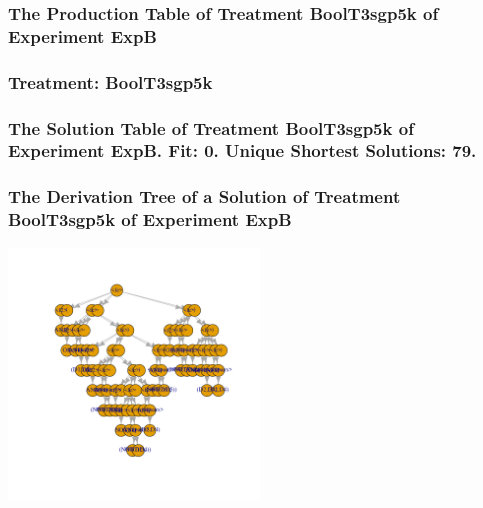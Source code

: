\documentclass[18pt,c]{beamer}
\begin{document}
 \begin{frame}
 \fontsize{8pt}{9pt}\selectfont
 \frametitle{ The Production Table of Treatment BoolT3sgp5k of Experiment ExpB }

 \label{ExpBGrammarTable023.tex}  
 \end{frame}

 \begin{frame}
 \fontsize{8pt}{9pt}\selectfont
 \frametitle{ Treatment: BoolT3sgp5k }

 \label{ExpBStatsTable025.tex}  
 \end{frame}

 \begin{frame}
 \fontsize{8pt}{9pt}\selectfont
 \frametitle{ The Solution Table of Treatment BoolT3sgp5k of Experiment ExpB. Fit: 0. Unique Shortest Solutions: 79. }

 \label{ExpBSolutionTable018.tex}  
 \end{frame}

 \begin{frame}
 \frametitle{ The Derivation Tree of a Solution of Treatment BoolT3sgp5k of Experiment ExpB }
 \begin{center}
\includegraphics[width=0.5\textwidth, angle=0]
{ExpBDerivationTreeFigure018.pdf}
 \end{center}
 \label{report/ExpBDerivationTreeFigure018.pdf}  
 \end{frame}
\end{document}
